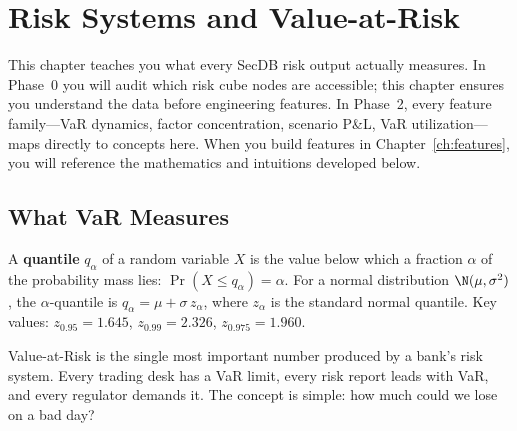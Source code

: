 
\chapter{Risk Systems and Value-at-Risk}
\label{ch:risk-systems}

\begin{projectconnection}
This chapter teaches you what every SecDB risk output actually measures.
In Phase~0 you will audit which risk cube nodes are accessible; this chapter
ensures you understand the data before engineering features.
In Phase~2, every feature family---VaR dynamics, factor concentration,
scenario P\&L, VaR utilization---maps directly to concepts here.
When you build features in Chapter~\ref{ch:features}, you will reference
the mathematics and intuitions developed below.
\end{projectconnection}


\section{What VaR Measures}
\label{sec:var-definition}

\begin{prereq}
A \textbf{quantile} $q_\alpha$ of a random variable $X$ is the value below
which a fraction $\alpha$ of the probability mass lies:
$\Pr(X \le q_\alpha) = \alpha$.
For a normal distribution $\N(\mu,\sigma^2)$, the $\alpha$-quantile is
$q_\alpha = \mu + \sigma\,z_\alpha$, where $z_\alpha$ is the standard
normal quantile.  Key values: $z_{0.95}=1.645$, $z_{0.99}=2.326$,
$z_{0.975}=1.960$.
\end{prereq}

Value-at-Risk is the single most important number produced by a bank's risk
system.  Every trading desk has a VaR limit, every risk report leads with VaR,
and every regulator demands it.  The concept is simple: how much could we lose
on a bad day?

